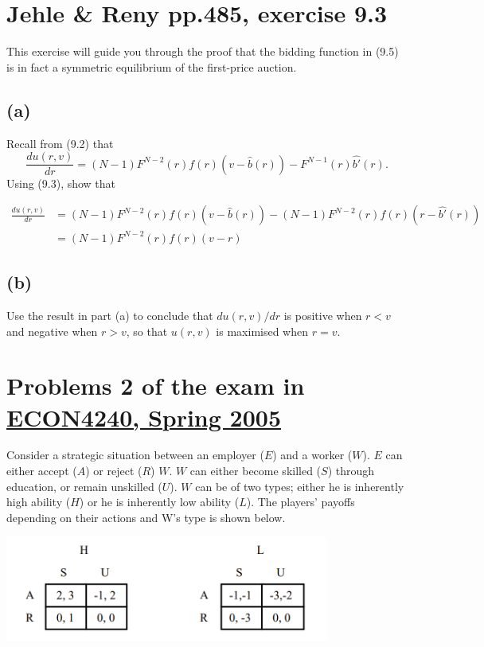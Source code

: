 \documentclass{article}
\begin{document}
\bigskip

\section{Jehle \& Reny pp.485, exercise 9.3}

This exercise will guide you through the proof that the bidding function in (9.5) is in fact a symmetric
equilibrium of the first-price auction.

\subsection*{(a)} Recall from (9.2) that
$$\frac{du(r,v)}{dr}=(N-1)F^{N-2}(r)f(r)(v-\hat{b}(r))-F^{N-1}(r)\hat{b'}(r).$$
Using (9.3), show that


\begin{align*}
\frac{du(r,v)}{dr}&=(N-1)F^{N-2}(r)f(r)(v-\hat{b}(r))-(N-1)F^{N-2}(r)f(r)(r-\hat{b'}(r)) \\
&= (N-1)F^{N-2}(r)f(r)(v-r)
\end{align*}

\subsection*{(b)}Use the result in part (a) to conclude that $du(r, v)/dr$ is positive when $r < v$ and negative when
$r > v$, so that $u(r, v)$ is maximised when $r = v$.

\section{Problems 2  of the exam in \href{https://www.uio.no/studier/emner/sv/oekonomi/ECON4240/previous-exams/}{ECON4240, Spring 2005}}

Consider a strategic situation between an employer ($E$) and a worker ($W$). $E$ can either accept
($A$) or reject ($R$) $W$. $W$ can either become skilled ($S$) through education, or remain unskilled
($U$). $W$ can be of two types; either he is inherently high ability ($H$) or he is inherently low
ability ($L$). The players' payoffs depending on their actions and W's type is shown below.

{\centering
\includegraphics[width=0.8\textwidth]{12.q2}
\vspace{2mm}}
\end{document}
